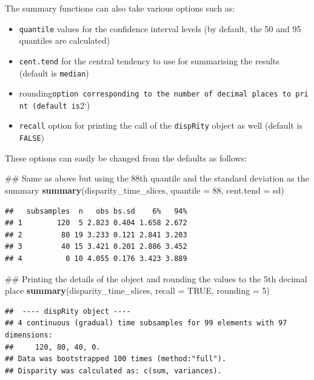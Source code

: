 \documentclass[]{book}
\newenvironment{Shaded}{\begin{snugshade}}{\end{snugshade}}
\newcommand{\KeywordTok}[1]{\textcolor[rgb]{0.13,0.29,0.53}{\textbf{#1}}}
\newcommand{\DataTypeTok}[1]{\textcolor[rgb]{0.13,0.29,0.53}{#1}}
\newcommand{\DecValTok}[1]{\textcolor[rgb]{0.00,0.00,0.81}{#1}}
\newcommand{\OtherTok}[1]{\textcolor[rgb]{0.56,0.35,0.01}{#1}}
\newcommand{\NormalTok}[1]{#1}
\providecommand{\tightlist}{%
  \setlength{\itemsep}{0pt}\setlength{\parskip}{0pt}}
\theoremstyle{definition}
\theoremstyle{definition}
\theoremstyle{remark}
\begin{document}
The summary functions can also take various options such as:

\begin{itemize}
\tightlist
\item
  \texttt{quantile} values for the confidence interval levels (by
  default, the 50 and 95 quantiles are calculated)
\item
  \texttt{cent.tend} for the central tendency to use for summarising the
  results (default is \texttt{median})
\item
  rounding\texttt{option\ corresponding\ to\ the\ number\ of\ decimal\ places\ to\ print\ (default\ is}2`)
\item
  \texttt{recall} option for printing the call of the \texttt{dispRity}
  object as well (default is \texttt{FALSE})
\end{itemize}

These options can easily be changed from the defaults as follows:

\begin{Shaded}
\begin{Highlighting}[]
\NormalTok{## Same as above but using the 88th quantile and the standard deviation as the summary }
\KeywordTok{summary}\NormalTok{(disparity_time_slices, }\DataTypeTok{quantile =} \DecValTok{88}\NormalTok{, }\DataTypeTok{cent.tend =}\NormalTok{ sd)}
\end{Highlighting}
\end{Shaded}

\begin{verbatim}
##   subsamples  n   obs bs.sd    6%   94%
## 1        120  5 2.823 0.404 1.658 2.672
## 2         80 19 3.233 0.121 2.841 3.203
## 3         40 15 3.421 0.201 2.886 3.452
## 4          0 10 4.055 0.176 3.423 3.889
\end{verbatim}

\begin{Shaded}
\begin{Highlighting}[]
\NormalTok{## Printing the details of the object and rounding the values to the 5th decimal place}
\KeywordTok{summary}\NormalTok{(disparity_time_slices, }\DataTypeTok{recall =} \OtherTok{TRUE}\NormalTok{, }\DataTypeTok{rounding =} \DecValTok{5}\NormalTok{)}
\end{Highlighting}
\end{Shaded}

\begin{verbatim}
##  ---- dispRity object ---- 
## 4 continuous (gradual) time subsamples for 99 elements with 97 dimensions:
##     120, 80, 40, 0.
## Data was bootstrapped 100 times (method:"full").
## Disparity was calculated as: c(sum, variances).
\end{verbatim}
\end{document}
